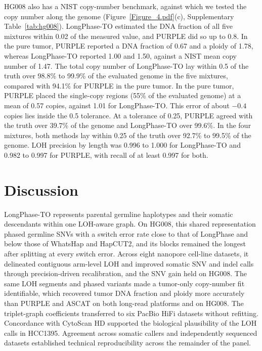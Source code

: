 \documentclass[unnumsec,webpdf,contemporary,large]{oup-authoring-template}
\begin{document}
HG008 also has a NIST copy-number benchmark, against which we tested the copy number along the genome (Figure~\ref{Figure_4.pdf}(c), Supplementary Table~\ref{tab:hg008}). LongPhase-TO estimated the DNA fraction of all five mixtures within 0.02 of the measured value, and PURPLE did so up to 0.8. In the pure tumor, PURPLE reported a DNA fraction of 0.67 and a ploidy of 1.78, whereas LongPhase-TO reported 1.00 and 1.50, against a NIST mean copy number of 1.47. The total copy number of LongPhase-TO lay within 0.5 of the truth over 98.8\% to 99.9\% of the evaluated genome in the five mixtures, compared with 94.1\% for PURPLE in the pure tumor. In the pure tumor, PURPLE placed the single-copy regions (55\% of the evaluated genome) at a mean of 0.57 copies, against 1.01 for LongPhase-TO. This error of about $-0.4$ copies lies inside the 0.5 tolerance. At a tolerance of 0.25, PURPLE agreed with the truth over 39.7\% of the genome and LongPhase-TO over 99.6\%. In the four mixtures, both methods lay within 0.25 of the truth over 92.7\% to 99.5\% of the genome. LOH precision by length was 0.996 to 1.000 for LongPhase-TO and 0.982 to 0.997 for PURPLE, with recall of at least 0.997 for both.


\section{Discussion}

LongPhase-TO represents parental germline haplotypes and their somatic descendants within one LOH-aware graph. On HG008, this shared representation phased germline SNVs with a switch error rate close to that of LongPhase and below those of WhatsHap and HapCUT2, and its blocks remained the longest after splitting at every switch error. Across eight nanopore cell-line datasets, it delineated contiguous arm-level LOH and improved somatic SNV and indel calls through precision-driven recalibration, and the SNV gain held on HG008. The same LOH segments and phased variants made a tumor-only copy-number fit identifiable, which recovered tumor DNA fraction and ploidy more accurately than PURPLE and ASCAT on both long-read platforms and on HG008. The triplet-graph coefficients transferred to six PacBio HiFi datasets without refitting. Concordance with CytoScan HD supported the biological plausibility of the LOH calls in HCC1395. Agreement across somatic callers and independently sequenced datasets established technical reproducibility across the remainder of the panel.
\end{document}

